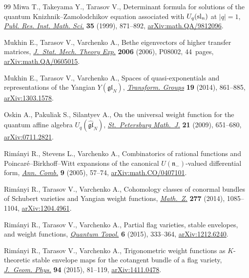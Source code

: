 \begin{thebibliography}{99}
Miwa T., Takeyama Y., Tarasov V., Determinant formula for solutions of the
 quantum {K}nizhnik--{Z}amolodchikov equation associated with {$U_q({\rm
 sl}_n)$} at {$|q|=1$},
 \href{https://doi.org/10.2977/prims/1195143360}{\textit{Publ. Res. Inst.
 Math. Sci.}} \textbf{35} (1999), 871--892,
 \href{http://arxiv.org/abs/math.QA/9812096}{arXiv:math.QA/9812096}.

Mukhin E., Tarasov V., Varchenko A., Bethe eigenvectors of higher transfer
 matrices,
 \href{https://doi.org/10.1088/1742-5468/2006/08/p08002}{\textit{J.~Stat.
 Mech. Theory Exp.}} \textbf{2006} (2006), P08002, 44~pages,
 \href{http://arxiv.org/abs/math.QA/0605015}{arXiv:math.QA/0605015}.

Mukhin E., Tarasov V., Varchenko A., Spaces of quasi-exponentials and
 representations of the {Y}angian {$Y(\mathfrak{gl}_N)$},
 \href{https://doi.org/10.1007/s00031-014-9275-8}{\textit{Transform. Groups}}
 \textbf{19} (2014), 861--885,
 \href{http://arxiv.org/abs/1303.1578}{arXiv:1303.1578}.

Oskin A., Pakuliak S., Silantyev A., On the universal weight function for the
 quantum affine algebra {$U_q(\widehat{\mathfrak{gl}}_N)$},
 \href{https://doi.org/10.1090/S1061-0022-2010-01110-5}{\textit{St.~Petersburg
 Math.~J.}} \textbf{21} (2009), 651--680,
 \href{http://arxiv.org/abs/0711.2821}{arXiv:0711.2821}.

Rim\'anyi R., Stevens L., Varchenko A., Combinatorics of rational functions and
 {P}oincar\'e--{B}irkhoff--{W}itt expansions of the canonical
 {$U(\mathfrak{n}_-)$}-valued differential form,
 \href{https://doi.org/10.1007/s00026-005-0241-3}{\textit{Ann. Comb.}}
 \textbf{9} (2005), 57--74,
 \href{http://arxiv.org/abs/math.CO/0407101}{arXiv:math.CO/0407101}.

Rim\'anyi R., Tarasov V., Varchenko A., Cohomology classes of conormal bundles
 of {S}chubert varieties and {Y}angian weight functions,
 \href{https://doi.org/10.1007/s00209-014-1295-5}{\textit{Math.~Z.}}
 \textbf{277} (2014), 1085--1104,
 \href{http://arxiv.org/abs/1204.4961}{arXiv:1204.4961}.

Rim\'anyi R., Tarasov V., Varchenko A., Partial flag varieties, stable
 envelopes, and weight functions,
 \href{https://doi.org/10.4171/QT/65}{\textit{Quantum Topol.}} \textbf{6}
 (2015), 333--364, \href{http://arxiv.org/abs/1212.6240}{arXiv:1212.6240}.

Rim\'anyi R., Tarasov V., Varchenko A., Trigonometric weight functions as
 {$K$}-theoretic stable envelope maps for the cotangent bundle of a flag
 variety,
 \href{https://doi.org/10.1016/j.geomphys.2015.04.002}{\textit{J.~Geom.
 Phys.}} \textbf{94} (2015), 81--119,
 \href{http://arxiv.org/abs/1411.0478}{arXiv:1411.0478}.


\end{thebibliography}
